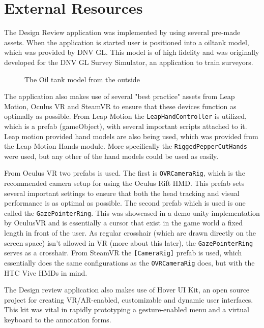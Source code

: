 
\section{External Resources}
The Design Review application was implemented by using several pre-made assets.
When the application is started user is positioned into a oiltank model, which was provided by DNV GL. 
This model is of high fidelity and was originally developed for the DNV GL Survey Simulator, an application to train surveyors.

\begin{figure}%
	\caption[The Oil tank model]{The Oil tank model from the outside}
	\label{fig:tank_outside}
\end{figure} 

The application also makes use of several "best practice" assets from Leap Motion, Oculus VR and SteamVR to ensure that these devices function
as optimally as possible. From Leap Motion the \texttt{LeapHandController} is utilized, which is a prefab (gameObject), with several important scripts attached to
it. Leap motion provided hand models are also being used, which was provided from the Leap Motion Hands-module. More specifically 
the \texttt{RiggedPepperCutHands} were used, but any other of the hand models could be used as easily.

From Oculus VR two prefabs is used. The first is \texttt{OVRCameraRig}, which is the recommended camera setup for using the Oculus Rift HMD. This 
prefab sets several important settings to ensure that both the head tracking and visual performance is as optimal as possible. The 
second prefab which is used is one called the \texttt{GazePointerRing}. This was showcased in a demo unity implementation by OculusVR
and is essentially a cursor that exist in the game world a fixed length in front of the user. As regular crosshair (which are drawn directly on the screen space)
isn't allowed in VR (more about this later), the \texttt{GazePointerRing} serves as a crosshair. 
From SteamVR the \texttt{[CameraRig]} prefab is used, which essentially does the same configurations as the \texttt{OVRCameraRig} does, but with the HTC Vive HMDs in mind.

The Design review application also makes use of Hover UI Kit, an open source project for creating VR/AR-enabled, customizable and dynamic user interfaces. 
This kit was vital in rapidly prototyping a gesture-enabled menu and a virtual keyboard to the annotation forms.

